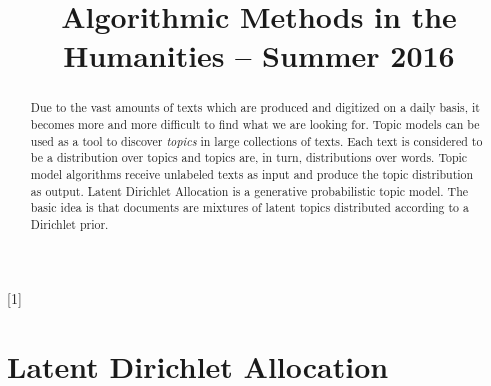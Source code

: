 \documentclass[a4paper,ngerman, english]{atseminar}
\title{Algorithmic Methods in the Humanities – Summer 2016}
\author{}
\begin{document}
\newcommand{\ed}{\textcolor{Blue}}[1]

\maketitle

\ENGLISH

\section{Latent Dirichlet Allocation}

\begin{abstract}
Due to the vast amounts of texts which are produced and digitized on a daily basis, it 
becomes more and more difficult to find what we are looking for. Topic models can 
be used as a tool to discover \textit{topics} in large collections of texts. Each text 
is considered to be a distribution over topics and topics are, in turn, distributions over
words. Topic model algorithms receive unlabeled texts as input and produce the topic 
distribution as output. 
Latent Dirichlet Allocation is a generative probabilistic topic model. The basic idea is
that documents are mixtures of latent topics distributed according to a Dirichlet prior.


\end{abstract}
\end{document}
